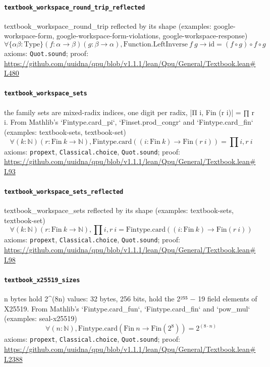 \documentclass[11pt]{article}
\begin{document}
\paragraph{\texttt{textbook\_workspace\_round\_trip\_reflected}}
textbook\_workspace\_round\_trip reflected by its shape (examples: google-workspace-form, google-workspace-form-violations, google-workspace-response)
\[ \forall \{\alpha \beta : \mathrm{Type}\} (f : \alpha \to \beta ) (g : \beta \to \alpha ), \mathrm{Function.LeftInverse}\ f\ g \to \mathrm{id} = (f \circ g) \circ f \circ g \]
\noindent axioms: \texttt{Quot.sound}; proof: \url{https://github.com/uuidna/qpu/blob/v1.1.1/lean/Qpu/General/Textbook.lean\#L480}

\paragraph{\texttt{textbook\_workspace\_sets}}
the family sets are mixed-radix indices, one digit per radix, |Π i, Fin (r i)| = ∏ r i. From Mathlib's `Fintype.card\_pi`, `Finset.prod\_congr` and `Fintype.card\_fin` (examples: textbook-sets, textbook-set)
\[ \forall (k : \mathbb{N}) (r : \mathrm{Fin}\ k \to \mathbb{N}), \mathrm{Fintype.card} ((i : \mathrm{Fin}\ k) \to \mathrm{Fin} (r\ i)) = \prod i, r\ i \]
\noindent axioms: \texttt{propext}, \texttt{Classical.choice}, \texttt{Quot.sound}; proof: \url{https://github.com/uuidna/qpu/blob/v1.1.1/lean/Qpu/General/Textbook.lean\#L93}

\paragraph{\texttt{textbook\_workspace\_sets\_reflected}}
textbook\_workspace\_sets reflected by its shape (examples: textbook-sets, textbook-set)
\[ \forall (k : \mathbb{N}) (r : \mathrm{Fin}\ k \to \mathbb{N}), \prod i, r\ i = \mathrm{Fintype.card} ((i : \mathrm{Fin}\ k) \to \mathrm{Fin} (r\ i)) \]
\noindent axioms: \texttt{propext}, \texttt{Classical.choice}, \texttt{Quot.sound}; proof: \url{https://github.com/uuidna/qpu/blob/v1.1.1/lean/Qpu/General/Textbook.lean\#L98}

\paragraph{\texttt{textbook\_x25519\_sizes}}
n bytes hold 2\^{}(8n) values: 32 bytes, 256 bits, hold the 2²⁵⁵ − 19 field elements of X25519. From Mathlib's `Fintype.card\_fun`, `Fintype.card\_fin` and `pow\_mul` (examples: seal-x25519)
\[ \forall (n : \mathbb{N}), \mathrm{Fintype.card} (\mathrm{Fin}\ n \to \mathrm{Fin} (2 ^{8})) = 2 ^{(8 \cdot n)} \]
\noindent axioms: \texttt{propext}, \texttt{Classical.choice}, \texttt{Quot.sound}; proof: \url{https://github.com/uuidna/qpu/blob/v1.1.1/lean/Qpu/General/Textbook.lean\#L2388}
\end{document}
